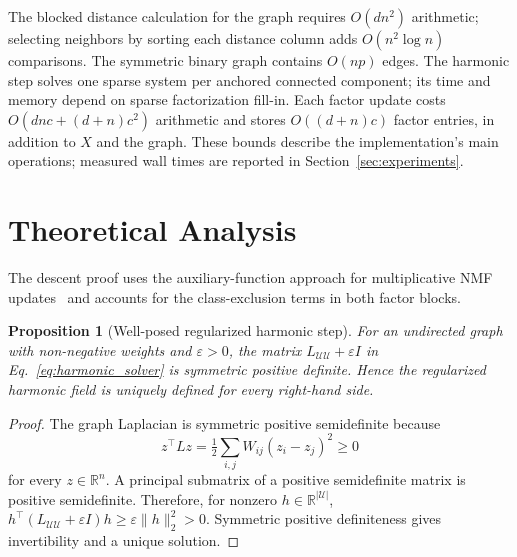\documentclass[preprint,12pt]{elsarticle}
\newtheorem{proposition}{Proposition}
\theoremstyle{remark}
\newcommand{\R}{\mathbb{R}}
\newcommand{\eps}{\varepsilon}
\begin{document}
The blocked distance calculation for the graph requires
$O(dn^2)$ arithmetic; selecting neighbors by sorting each distance
column adds $O(n^2\log n)$ comparisons. The symmetric binary graph
contains $O(np)$ edges. The harmonic step solves one sparse system per
anchored connected component; its time and memory depend on sparse
factorization fill-in. Each factor update costs
$O(dnc+(d+n)c^2)$ arithmetic and stores $O((d+n)c)$ factor entries,
in addition to $X$ and the graph. These bounds describe the
implementation's main operations; measured wall times are reported in
Section~\ref{sec:experiments}.

\section{Theoretical Analysis}
\label{sec:theory}

The descent proof uses the auxiliary-function approach for
multiplicative NMF updates~\cite{lee2000algorithms,li2026hlpnmf} and
accounts for the class-exclusion terms in both factor blocks.

\begin{proposition}[Well-posed regularized harmonic step]
For an undirected graph with non-negative weights and $\eps>0$, the
matrix $L_{\mathcal U\mathcal U}+\eps I$ in
Eq.~\eqref{eq:harmonic_solver} is symmetric positive definite. Hence
the regularized harmonic field is uniquely defined for every right-hand
side.
\end{proposition}
\begin{proof}
The graph Laplacian is symmetric positive semidefinite because
\begin{equation*}
z^\top Lz=\tfrac12\sum_{i,j}W_{ij}(z_i-z_j)^2\ge0
\end{equation*}
for every $z\in\R^n$. A principal submatrix of a positive semidefinite matrix
is positive semidefinite. Therefore, for nonzero
$h\in\R^{|\mathcal U|}$,
$h^\top(L_{\mathcal U\mathcal U}+\eps I)h
\ge\eps\|h\|_2^2>0$. Symmetric positive definiteness gives
invertibility and a unique solution.
\end{proof}
\end{document}
